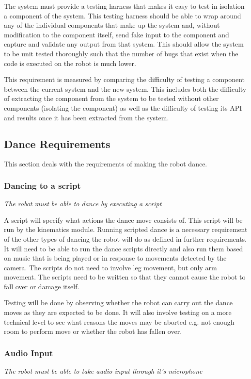 \documentclass[english,12pt]{scrartcl}
\newcommand{\requirement}[1]{\textit{#1}}
\begin{document}
				The system must provide a testing harness that makes it easy to test in isolation a
				component of the system. This testing harness should be able to wrap around any of the
				individual components that make up the system and, without modification to the component
				itself, send fake input to the component and capture and validate any output from that
				system. This should allow the system to be unit tested thoroughly such that the number
				of bugs that exist when the code is executed on the robot is much lower.
	
				This requirement is measured by comparing the difficulty of testing a component between
				the current system and the new system. This includes both the difficulty of extracting
				the component from the system to be tested without other components (isolating the
				component) as well as the difficulty of testing its API and results once it has been
				extracted from the system.
		\subsection{Dance Requirements}
		This section deals with the requirements of making the robot dance. 
			\subsubsection{Dancing to a script}
				\requirement{The robot must be able to dance by executing a script}

				A script will specify what actions the dance move consists of. This script will be run by the
kinematics module.
				Running scripted dance is a necessary requirement of the other types of dancing the robot will do as defined in further requirements. It will need to be able to run the dance scripts directly and also run them based on music that is being played or in response to movements detected by the camera.
				The scripts do not need to involve leg movement, but only arm movement.
				The scripts need to be written so that they cannot cause the robot to fall over or damage itself.
				
				Testing will be done by observing whether the robot can carry out the dance moves as they are
				expected to be done. It will also involve testing on a more technical level to see what reasons the
				moves may be aborted e.g. not enough room to perform move or whether the robot has fallen
				over.

			\subsubsection{Audio Input}
				\requirement{The robot must be able to take audio input through it's microphone}
\end{document}
